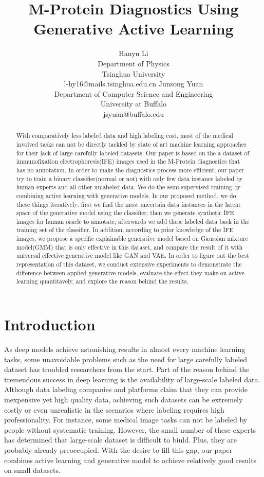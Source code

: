 \documentclass[letterpaper]{article}
\title{M-Protein Diagnostics Using Generative Active Learning}
\author{Hanyu Li\\
Department of Physics\\
Tsinghua University\\
l-hy16@mails.tsinghua.edu.cn
\And
Junsong Yuan\\
Department of Computer Science and Engineering\\
University at Buffalo\\
jsyuan@buffalo.edu}
\author{}
\begin{document}
\maketitle


\begin{abstract}
    With comparatively less labeled data and high labeling cost, most of the medical involved tasks can not be directly tackled by state of art machine learning approaches for their lack of large carefully labeled datasets. Our paper is based on the a dataset of immunofixation electrophoresis(IFE) images used in the M-Protein diagnostics that has no annotation. In order to make the diagnostics process more efficient, our paper try to train a binary classifier(normal or not) with only few data instance labeled by human experts and all other unlabeled data. We do the semi-supervised training by combining active learning with generative models. In our proposed method, we do these things iteratively: first we find the most uncertain data instances in the latent space of the generative model using the classifier; then we generate synthetic IFE images for human oracle to annotate; afterwards we add these labeled data back in the training set of the classifier. In addition, according to prior knowledge of the IFE images, we propose a specific explainable generative model based on Gaussian mixture model(GMM) that is only effective in this dataset, and compare the result of it with universal effective generative model like GAN and VAE. In order to figure out the best representation of this dataset, we conduct extensive experiments to demonstrate the difference between applied generative models, evaluate the effect they make on active learning quantitavely, and explore the reason behind the results.
\end{abstract}


\section{Introduction}
\par As deep models achieve astonishing results in almost every machine learning tasks, some unavoidable problems such as the need for large carefully labeled dataset has troubled researchers from the start. Part of the reason behind the tremendous success in deep learning is the availability of large-scale labeled data\cite{sun2017revisiting}. Although data labeling companies and platforms claim that they can provide inexpensive yet high quality data\cite{buhrmester2011amazon}, achieving such datasets can be extremely costly or even unrealistic in the scenarios where labeling requires high professionality. For instance, some medical image tasks can not be labeled by people without systematic training. However, the small number of these experts has determined that large-scale dataset is difficult to biuld. Plus, they are probably already preoccupied. With the desire to fill this gap, our paper combines active learning and generative model to achieve relatively good results on small datasets.
\end{document}

